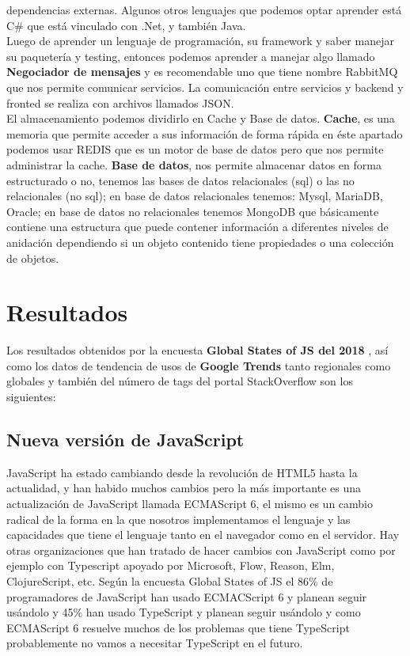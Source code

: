 \documentclass[twocolumns,a4paper]{IEEEtran}
\begin{document}
dependencias externas.  Algunos otros lenguajes que podemos optar aprender está
C\# que está vinculado con .Net, y también Java.\\
Luego de aprender un lenguaje de programación, su framework y saber manejar su
paquetería y testing, entonces podemos aprender a manejar algo llamado
\textbf{Negociador de mensajes} y es recomendable uno que tiene nombre RabbitMQ
que nos permite comunicar servicios. La comunicación entre servicios y backend
y fronted se realiza con archivos llamados JSON.\\
El almacenamiento podemos dividirlo en Cache y Base de datos. \textbf{Cache},
es una memoria que permite acceder a sus información de forma rápida en éste
apartado podemos usar REDIS que es un motor de base de datos pero que nos
permite administrar la cache. \textbf{Base de datos}, nos permite almacenar
datos en forma estructurado o no, tenemos las bases de datos relacionales (sql)
o las no relacionales (no sql); en base de datos relacionales tenemos: Mysql,
MariaDB, Oracle; en base de datos no relacionales tenemos MongoDB que
básicamente contiene una estructura que puede contener información a diferentes
niveles de anidación dependiendo si un objeto contenido tiene propiedades o una
colección de objetos.

\section{Resultados}
Los resultados obtenidos por la encuesta \textbf{Global States of JS del 2018}
\cite{EncuestaJS2018:online}, así como los datos de tendencia de usos de
\textbf{Google Trends} tanto regionales como globales
\cite{GoogleTrends2018:online} y también del número de tags del portal
StackOverflow son los siguientes: \subsection{Nueva versión de JavaScript}
JavaScript ha estado cambiando desde la revolución de HTML5 hasta la
actualidad, y han habido muchos cambios pero la más importante es una
actualización de JavaScript llamada ECMAScript 6, el mismo es un cambio radical
de la forma en la que nosotros implementamos el lenguaje y las capacidades que
tiene el lenguaje tanto en el navegador como en el servidor. Hay otras
organizaciones que han tratado de hacer cambios con JavaScript como por ejemplo
con Typescript apoyado por Microsoft, Flow, Reason, Elm, ClojureScript, etc.
Según la encuesta Global States of JS el 86\% de programadores de JavaScript
han usado ECMACScript 6 y planean seguir usándolo y 45\% han usado TypeScript y
planean seguir usándolo y como ECMAScript 6 resuelve muchos de los problemas
que tiene TypeScript probablemente no vamos a necesitar TypeScript en el
futuro.
\end{document}
